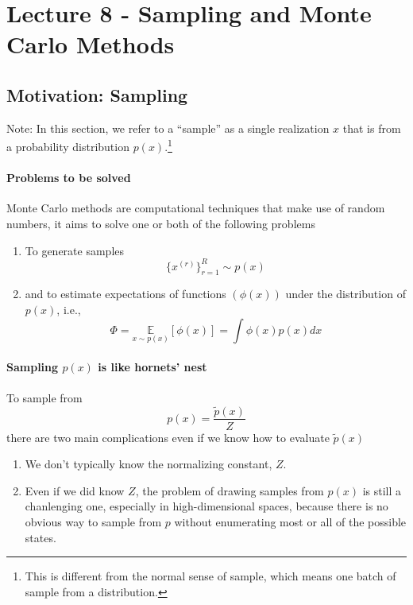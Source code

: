 \documentclass[11pt]{article}
\begin{document}
\section{Lecture 8 - Sampling and Monte Carlo Methods}
\subsection{Motivation: Sampling}
Note: In this section, we refer to a ``sample'' as a single realization $x$ that is from a probability distribution $p(x)$.\footnote{This is different from the normal sense of sample, which means one batch of sample from a distribution.}

\paragraph{Problems to be solved} Monte Carlo methods are computational techniques that make use of random numbers, it aims to solve one or both of the following problems
\begin{enumerate}
    \item To generate samples
        \begin{equation}
            \{x^{(r)}\}_{r=1}^{R} \sim p(x)
        \end{equation}
    \item and to estimate expectations of functions $(\phi(x) )$ under the distribution of $p(x)$, i.e.,
        \begin{equation}
            \Phi=\underset{x \sim p(x)}{\mathbb{E}}[\phi(x)]=\int \phi(x) p(x) d x
        \end{equation}
\end{enumerate}

\paragraph{Sampling $p(x)$ is like hornets' nest}
To sample from
\begin{equation}
    p(x)=\frac{\tilde{p}(x)}{Z}
\end{equation}
there are two main complications even if we know how to evaluate $\tilde p (x)$
\begin{enumerate}
    \item We don't typically know the normalizing constant, $Z$.
    \item Even if we did know $Z$, the problem of drawing samples from $p(x)$ is still a chanlenging one, especially in high-dimensional spaces, because there is no obvious way to sample from $p$ without enumerating most or all of the  possible states. 
\end{enumerate}
\end{document}
